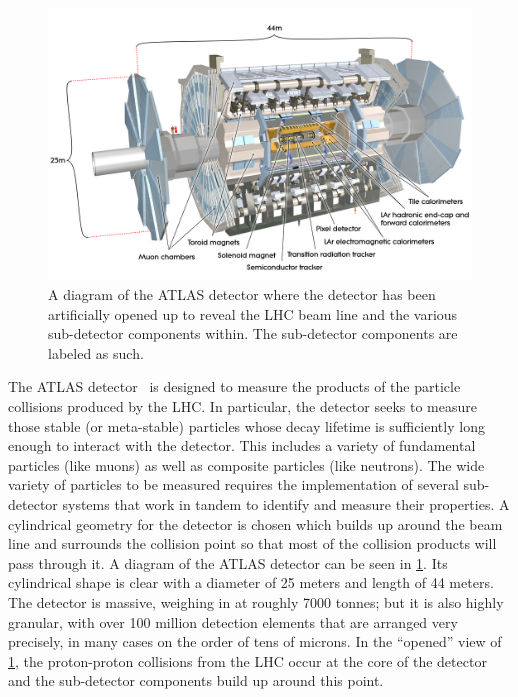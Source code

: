 

\begin{figure}[ht!]
\centering
\includegraphics[width=.9\textwidth]{figures/atlas/detector.jpg}
\caption{A diagram of the ATLAS detector where the detector has
been artificially opened up to reveal the LHC beam line and the
various sub-detector components within. The sub-detector components
are labeled as such.}
\label{fig:atlas}
\end{figure}

The ATLAS detector~\cite{ATLAS} is designed to measure
the products of the particle collisions produced by the LHC.
In particular, the detector seeks to measure those stable 
(or meta-stable) particles whose decay lifetime is sufficiently
long enough to interact with the detector.  This includes
a variety of fundamental particles (like muons) as well as 
composite particles (like neutrons). The wide variety of 
particles to be measured requires the implementation
of several sub-detector systems that work in tandem 
to identify and measure their properties. 
A cylindrical geometry for the detector is chosen
which builds up around the beam line and surrounds
the collision point so that most of the collision
products will pass through it.
A diagram of the ATLAS detector can be seen in \fig\ref{fig:atlas}.
Its cylindrical shape is clear with a diameter of 25 meters
and length of 44 meters. The detector is massive, weighing
in at roughly 7000 tonnes; but it is also highly granular, with
over 100 million detection elements that are arranged very precisely, 
in many cases on the order of tens of microns.
In the ``opened'' view of \fig\ref{fig:atlas}, the proton-proton
collisions from the LHC occur at the core of the detector
and the sub-detector components build up around this point.

